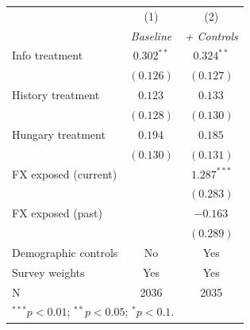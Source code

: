 \begin{tabular}{lcc}
\toprule
 & (1) & (2) \\
 & \textit{Baseline} & \textit{+ Controls} \\
\midrule
Info treatment & $0.302^{**}$ & $0.324^{**}$ \\
 & $(0.126)$ & $(0.127)$ \\[0.3em]
History treatment & $0.123^{}$ & $0.133^{}$ \\
 & $(0.128)$ & $(0.130)$ \\[0.3em]
Hungary treatment & $0.194^{}$ & $0.185^{}$ \\
 & $(0.130)$ & $(0.131)$ \\[0.3em]
FX exposed (current) & & $1.287^{***}$ \\
 & & $(0.283)$ \\[0.3em]
FX exposed (past) & & $-0.163^{}$ \\
 & & $(0.289)$ \\[0.3em]
\midrule
Demographic controls & No & Yes \\
Survey weights & Yes & Yes \\
N & 2036 & 2035 \\
\bottomrule
\multicolumn{3}{l}{\scriptsize $^{***}p<0.01$; $^{**}p<0.05$; $^{*}p<0.1$.} \\
\end{tabular}
